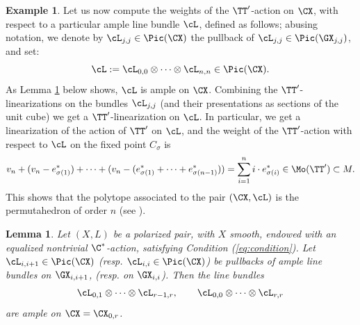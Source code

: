 \documentclass[reqno]{amsproc}
\newtheorem{lemma}[theorem]{Lemma}
\theoremstyle{definition}
\newtheorem{example}[theorem]{Example}
\begin{document}
\begin{example}
Let us now compute the weights of the $\TT'$-action on $\CX$, with respect to a particular ample line bundle $\cL$, defined as follows; abusing notation, we denote by $\cL_{j,j}\in \Pic(\CX)$ the pullback of $\cL_{j,j}\in \Pic(\GX_{j,j})$, and set:
$$\cL:=\cL_{0,0}\otimes \dots \otimes \cL_{n,n}\in \Pic(\CX).$$
As Lemma \ref{lem:ampleg} below shows, $\cL$ is ample on $\CX$. Combining the  $\TT'$-linearizations on the bundles $\cL_{j,j}$ (and their presentations as sections of the unit cube) we get a $\TT'$-linearization on $\cL$. 
In particular, we get a linearization of the action of $\TT'$ on $\cL$, and the weight of the $\TT'$-action with respect to $\cL$ on the fixed point $C_\sigma$ is 
    $$v_n+(v_n-e^*_{\sigma(1)})+\cdots+(v_n-(e^*_{\sigma(1)}+\cdots+e^*_{\sigma(n-1)}))=\sum_{i=1}^n i\cdot e^*_{\sigma(i)}\in \Mo(\TT')\subset M.$$
   This shows that the polytope associated to the pair $(\CX,\cL)$ is the permutahedron of order $n$ (see \cite[9.2]{Ziegler}).
\end{example}

\begin{lemma}\label{lem:ampleg}
Let $(X,L)$ be a polarized pair, with $X$ smooth, endowed with an equalized nontrivial $\C^*$-action, satisfying Condition (\ref{eq:condition}).
Let $\cL_{i,i+1} \in \Pic(\CX)$ (resp. $\cL_{i,i} \in \Pic(\CX)$) be pullbacks of ample line bundles on $\GX_{i,i+1}$, (resp. on $\GX_{i,i}$).  Then the line bundles
\[
\cL_{0,1}\otimes\cdots\otimes\cL_{r-1,r}, \qquad \cL_{0,0}\otimes\cdots\otimes\cL_{r,r}
\]
are ample on $\CX=\CX_{0,r}$.
\end{lemma}
\end{document}
